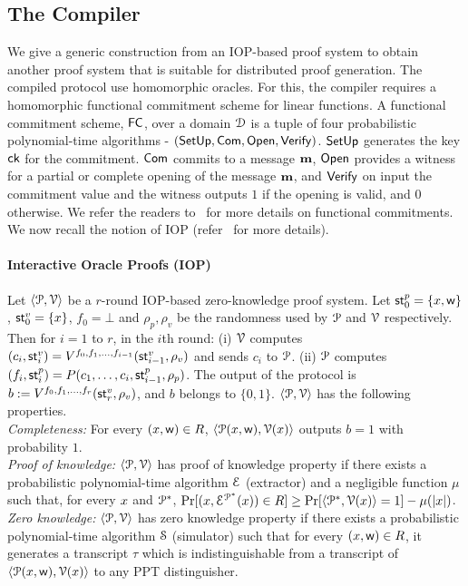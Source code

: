 \subsection{The Compiler}\label{sec:compiler_construction}
We give a generic construction from an IOP-based proof system to obtain another proof system that is suitable for distributed proof generation. The compiled protocol use homomorphic oracles. 
For this, the compiler requires a homomorphic functional commitment scheme for linear functions. A functional commitment scheme, $\mathsf{FC}$, over a domain $\mathcal{D}$ is a tuple of four probabilistic polynomial-time algorithms - $(\mathsf{SetUp}, \mathsf{Com}, \mathsf{Open}, \mathsf{Verify})$. $\mathsf{SetUp}$ generates the key $\mathsf{ck}$ for the commitment. $\mathsf{Com}$ commits to a message ${\bf m}$, $\mathsf{Open}$ provides a witness for a partial or complete opening of the message ${\bf m}$, and $\mathsf{Verify}$ on input the commitment value and the witness outputs $1$ if the opening is valid, and $0$ otherwise. We refer the readers to~\cite{functionalcom} for more details on functional commitments. We now recall the notion of IOP
(refer~\cite{BCS16} for more details).
\paragraph*{Interactive Oracle Proofs (IOP)} Let $\langle \mathcal{P},\mathcal{V}\rangle$ be a $r$-round IOP-based zero-knowledge proof system. Let $\mathsf{st}^p_0 = \{{x}, \mathsf{w}\}$, $\mathsf{st}^v_0 = \{{x}\}$, $f_0 = \bot$ and $\rho_p, \rho_v$ be the randomness used by $\mathcal{P}$ and $\mathcal{V}$ respectively.
Then for $i = 1$ to $r$, in the $i$th round: (i) $\mathcal{V}$ computes $(c_i,\mathsf{st}^v_i) = V^{f_0, f_1, \ldots, f_{i-1}}(\mathsf{st}^v_{i-1}, \rho_v)$ and sends $c_i$ to $\mathcal{P}$. 
(ii) $\mathcal{P}$ computes $(f_i, \mathsf{st}^p_i) = P(c_1, \ldots, c_i, \mathsf{st}^p_{i-1}, \rho_p)$.
The output of the protocol is $b := V^{f_0, f_1, \ldots, f_{r}}(\mathsf{st}^v_{r}, \rho_v)$, and $b$ belongs to $\{0,1\}$. $\langle \mathcal{P},\mathcal{V}\rangle$ has the following properties.\\
{\em Completeness:} For every $({x}, \mathsf{w}) \in R$, $\langle \mathcal{P}({x}, \mathsf{w}),\mathcal{V}({x})\rangle$ outputs $b = 1$ with probability $1$.\\
{\em Proof of knowledge:} $\langle \mathcal{P},\mathcal{V}\rangle$ has proof of knowledge property if there exists a probabilistic polynomial-time algorithm $\mathcal{E}$ (extractor) and a negligible function $\mu$ such that, for every ${x}$ and $\mathcal{P}^\ast$, $\Pr[({x}, \mathcal{E}^{\mathcal{P}^\ast}({x})) \in R] \geq \Pr[\langle \mathcal{P}^\ast,\mathcal{V}({x})\rangle = 1] - \mu(|{x}|)$.\\
{\em Zero knowledge:} $\langle \mathcal{P},\mathcal{V}\rangle$ has zero knowledge property if there exists a probabilistic polynomial-time algorithm $\mathcal{S}$ (simulator) such that for every $({x}, \mathsf{w}) \in R$, it generates a transcript $\tau$ which is indistinguishable from a transcript of $\langle \mathcal{P}({x}, \mathsf{w}),\mathcal{V}({x})\rangle$ to any PPT distinguisher.


